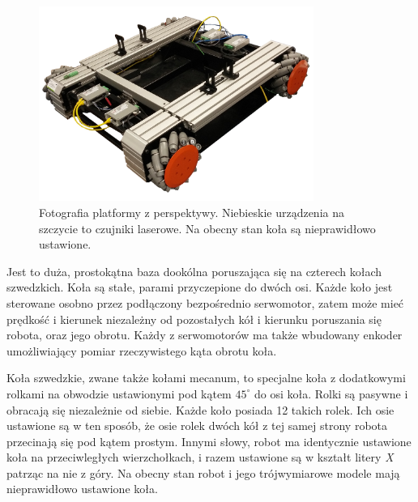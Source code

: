 \begin{figure}[H]
\centering
 \includegraphics[width=0.8\textwidth]{graphics/base_photo.png}
\caption{Fotografia platformy z perspektywy. Niebieskie urządzenia na szczycie to czujniki laserowe. Na obecny stan koła są nieprawidłowo ustawione.}
\end{figure} 

Jest to duża, prostokątna baza dookólna poruszająca się na czterech kołach szwedzkich.
Koła są stałe, parami przyczepione do dwóch osi.
Każde koło jest sterowane osobno przez podłączony bezpośrednio serwomotor, zatem może mieć prędkość i kierunek niezależny od pozostałych kół i kierunku poruszania się robota, oraz jego obrotu.
Każdy z serwomotorów ma także wbudowany enkoder umożliwiający pomiar rzeczywistego kąta obrotu koła.

Koła szwedzkie, zwane także kołami mecanum, to specjalne koła z dodatkowymi rolkami na obwodzie ustawionymi pod kątem $45^\circ$ do osi koła.
Rolki są pasywne i obracają się niezależnie od siebie. Każde koło posiada 12 takich rolek.
Ich osie ustawione są w ten sposób, że osie rolek dwóch kół z tej samej strony robota przecinają się pod kątem prostym.
Innymi słowy, robot ma identycznie ustawione koła na przeciwległych wierzchołkach, i razem ustawione są w kształt litery \emph{X} patrząc na nie z góry.
Na obecny stan robot i jego trójwymiarowe modele mają nieprawidłowo ustawione koła.

